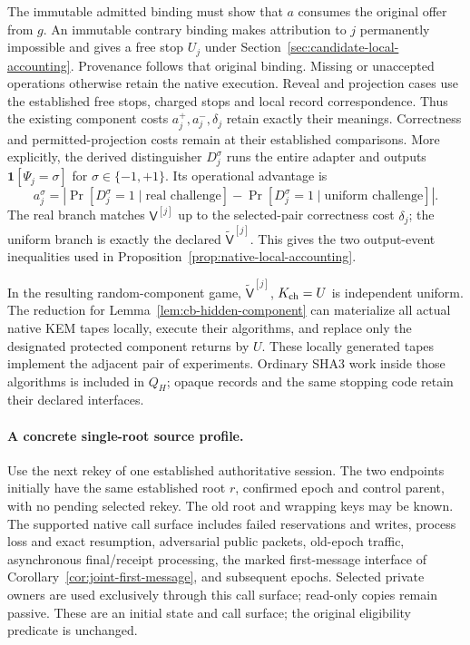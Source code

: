 The immutable admitted binding must show that $a$ consumes the original
offer from $g$. An immutable contrary binding makes attribution to $j$
permanently impossible and gives a free stop $U_j$ under
Section~\ref{sec:candidate-local-accounting}. Provenance follows that
original binding. Missing or unaccepted operations otherwise retain the
native execution. Reveal and projection cases use the established free
stops, charged stops and local record correspondence. Thus the existing
component costs $a_j^+,a_j^-,\delta_j$ retain exactly their meanings.
Correctness and permitted-projection costs remain at their established
comparisons.
More explicitly, the derived distinguisher $D_j^\sigma$ runs the entire
adapter and outputs $\mathbf1[\Psi_j=\sigma]$ for
$\sigma\in\{-1,+1\}$. Its operational advantage is
\[
 a_j^\sigma=\left|\Pr[D_j^\sigma=1\mid\text{real challenge}]
                    -\Pr[D_j^\sigma=1\mid\text{uniform challenge}]\right|.
\]
The real branch matches $\mathsf V^{[j]}$ up to the selected-pair
correctness cost $\delta_j$; the uniform branch is exactly the declared
$\widetilde{\mathsf V}^{[j]}$. This gives the two output-event
inequalities used in Proposition~\ref{prop:native-local-accounting}.

In the resulting random-component game,
$\widetilde{\mathsf V}^{[j]}$, $K_{\rm ch}=U$ is independent uniform.
The reduction for Lemma~\ref{lem:cb-hidden-component} can materialize all
actual native KEM tapes locally, execute their algorithms, and replace
only the designated protected component returns by $U$. These locally
generated tapes implement the adjacent pair of experiments. Ordinary SHA3 work
inside those algorithms is included in $Q_H$; opaque records and the same
stopping code retain their declared interfaces.

\paragraph{A concrete single-root source profile.}
Use the next rekey of one established authoritative session. The two
endpoints initially have the same established root $r$, confirmed epoch
and control parent, with no pending selected rekey. The old root and
wrapping keys may be known. The supported native call surface includes
failed reservations and writes, process loss and exact resumption,
adversarial public packets, old-epoch traffic, asynchronous final/receipt
processing, the marked first-message interface of
Corollary~\ref{cor:joint-first-message}, and subsequent epochs. Selected
private owners are used exclusively through this call surface; read-only
copies remain passive.
These are an initial state and call surface; the original eligibility
predicate is unchanged.


